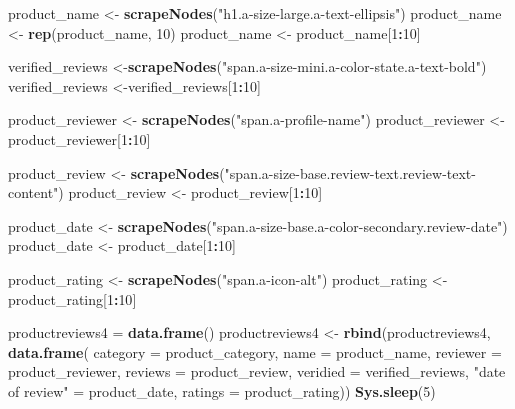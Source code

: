 \documentclass[
]{article}
\newenvironment{Shaded}{\begin{snugshade}}{\end{snugshade}}
\newcommand{\AttributeTok}[1]{\textcolor[rgb]{0.13,0.29,0.53}{#1}}
\newcommand{\DecValTok}[1]{\textcolor[rgb]{0.00,0.00,0.81}{#1}}
\newcommand{\FunctionTok}[1]{\textcolor[rgb]{0.13,0.29,0.53}{\textbf{#1}}}
\newcommand{\NormalTok}[1]{#1}
\newcommand{\OtherTok}[1]{\textcolor[rgb]{0.56,0.35,0.01}{#1}}
\newcommand{\SpecialCharTok}[1]{\textcolor[rgb]{0.81,0.36,0.00}{\textbf{#1}}}
\newcommand{\StringTok}[1]{\textcolor[rgb]{0.31,0.60,0.02}{#1}}
\begin{document}
\begin{Shaded}
\begin{Highlighting}[]
\NormalTok{  product\_name }\OtherTok{\textless{}{-}} \FunctionTok{scrapeNodes}\NormalTok{(}\StringTok{"h1.a{-}size{-}large.a{-}text{-}ellipsis"}\NormalTok{)}
\NormalTok{  product\_name }\OtherTok{\textless{}{-}} \FunctionTok{rep}\NormalTok{(product\_name, }\DecValTok{10}\NormalTok{)}
\NormalTok{  product\_name }\OtherTok{\textless{}{-}}\NormalTok{ product\_name[}\DecValTok{1}\SpecialCharTok{:}\DecValTok{10}\NormalTok{]}
  
\NormalTok{  verified\_reviews }\OtherTok{\textless{}{-}}\FunctionTok{scrapeNodes}\NormalTok{(}\StringTok{"span.a{-}size{-}mini.a{-}color{-}state.a{-}text{-}bold"}\NormalTok{)}
\NormalTok{  verified\_reviews }\OtherTok{\textless{}{-}}\NormalTok{verified\_reviews[}\DecValTok{1}\SpecialCharTok{:}\DecValTok{10}\NormalTok{]}
  
\NormalTok{  product\_reviewer }\OtherTok{\textless{}{-}} \FunctionTok{scrapeNodes}\NormalTok{(}\StringTok{"span.a{-}profile{-}name"}\NormalTok{)}
\NormalTok{  product\_reviewer }\OtherTok{\textless{}{-}}\NormalTok{ product\_reviewer[}\DecValTok{1}\SpecialCharTok{:}\DecValTok{10}\NormalTok{]}
  
\NormalTok{  product\_review }\OtherTok{\textless{}{-}} \FunctionTok{scrapeNodes}\NormalTok{(}\StringTok{"span.a{-}size{-}base.review{-}text.review{-}text{-}content"}\NormalTok{)}
\NormalTok{  product\_review }\OtherTok{\textless{}{-}}\NormalTok{ product\_review[}\DecValTok{1}\SpecialCharTok{:}\DecValTok{10}\NormalTok{]}
  
\NormalTok{  product\_date }\OtherTok{\textless{}{-}} \FunctionTok{scrapeNodes}\NormalTok{(}\StringTok{"span.a{-}size{-}base.a{-}color{-}secondary.review{-}date"}\NormalTok{)}
\NormalTok{  product\_date }\OtherTok{\textless{}{-}}\NormalTok{ product\_date[}\DecValTok{1}\SpecialCharTok{:}\DecValTok{10}\NormalTok{]}
  
\NormalTok{  product\_rating }\OtherTok{\textless{}{-}} \FunctionTok{scrapeNodes}\NormalTok{(}\StringTok{"span.a{-}icon{-}alt"}\NormalTok{)}
\NormalTok{  product\_rating }\OtherTok{\textless{}{-}}\NormalTok{ product\_rating[}\DecValTok{1}\SpecialCharTok{:}\DecValTok{10}\NormalTok{]}
  
\NormalTok{  productreviews4 }\OtherTok{=} \FunctionTok{data.frame}\NormalTok{()}
\NormalTok{  productreviews4 }\OtherTok{\textless{}{-}} \FunctionTok{rbind}\NormalTok{(productreviews4, }\FunctionTok{data.frame}\NormalTok{(}
                      \AttributeTok{category =}\NormalTok{ product\_category,}
                      \AttributeTok{name =}\NormalTok{ product\_name,}
                      \AttributeTok{reviewer =}\NormalTok{ product\_reviewer,}
                      \AttributeTok{reviews =}\NormalTok{ product\_review,}
                      \AttributeTok{veridied =}\NormalTok{ verified\_reviews,}
                      \StringTok{"date of review"} \OtherTok{=}\NormalTok{ product\_date,}
                      \AttributeTok{ratings =}\NormalTok{ product\_rating))}
  \FunctionTok{Sys.sleep}\NormalTok{(}\DecValTok{5}\NormalTok{)}
  

\end{Highlighting}
\end{Shaded}
\end{document}
